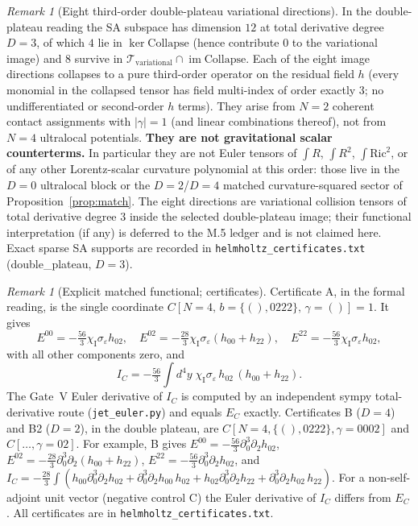 \documentclass{article}
\theoremstyle{remark}
\newtheorem{remark}[proposition]{Remark}
\newcommand{\sigeps}{\sigma_\varepsilon}
\newcommand{\chiI}{\chi_{\mathrm I}}
\newcommand{\Coll}{\mathrm{Collapse}}
\begin{document}
\begin{remark}[Eight third-order double-plateau variational directions]
\label{rem:thirdorder}
In the double-plateau reading the SA subspace has dimension $12$ at total derivative degree $D=3$, of which $4$ lie in $\ker\Coll$ (hence contribute $0$ to the variational image) and $8$ survive in $\mathcal T_{\mathrm{variational}}\cap\operatorname{im}\Coll$.
Each of the eight image directions collapses to a pure third-order operator on the residual field $h$ (every monomial in the collapsed tensor has field multi-index of order exactly $3$; no undifferentiated or second-order $h$ terms).
They arise from $N=2$ coherent contact assignments with $|\gamma|=1$ (and linear combinations thereof), not from $N=4$ ultralocal potentials.
\textbf{They are not gravitational scalar counterterms.}
In particular they are not Euler tensors of $\int R$, $\int R^2$, $\int\mathrm{Ric}^2$, or of any other Lorentz-scalar curvature polynomial at this order: those live in the $D=0$ ultralocal block or the $D=2$/$D=4$ matched curvature-squared sector of Proposition~\ref{prop:match}.
The eight directions are variational collision tensors of total derivative degree $3$ inside the selected double-plateau image; their functional interpretation (if any) is deferred to the M.5 ledger and is not claimed here.
Exact sparse SA supports are recorded in \texttt{helmholtz\_certificates.txt} (double\_plateau, $D=3$).
\end{remark}

\begin{remark}[Explicit matched functional; certificates]
\label{rem:cert}
Certificate A, in the formal reading, is the single coordinate $C[N=4,\,b=\{(),0222\},\,\gamma=()]=1$. It gives
\[
E^{00}=-\tfrac{56}3\chiI\sigeps h_{02},\quad E^{02}=-\tfrac{28}3\chiI\sigeps(h_{00}+h_{22}),\quad E^{22}=-\tfrac{56}3\chiI\sigeps h_{02},
\]
with all other components zero, and
\[
I_C=-\tfrac{56}3\int d^4y\;\chiI\sigeps\,h_{02}\,(h_{00}+h_{22}).
\]
The Gate~V Euler derivative of $I_C$ is computed by an independent sympy total-derivative route (\texttt{jet\_euler.py}) and equals $E_C$ exactly.
Certificates B ($D=4$) and B2 ($D=2$), in the double plateau, are $C[N=4,\{(),0222\},\gamma=0002]$ and $C[\ldots,\gamma=02]$.
For example, B gives $E^{00}=-\tfrac{56}3\partial_0^3\partial_2h_{02}$, $E^{02}=-\tfrac{28}3\partial_0^3\partial_2(h_{00}+h_{22})$, $E^{22}=-\tfrac{56}3\partial_0^3\partial_2h_{02}$, and $I_C=-\tfrac{28}3\int(h_{00}\partial_0^3\partial_2h_{02}+\partial_0^3\partial_2h_{00}\,h_{02}+h_{02}\partial_0^3\partial_2h_{22}+\partial_0^3\partial_2h_{02}\,h_{22})$.
For a non-self-adjoint unit vector (negative control C) the Euler derivative of $I_C$ differs from $E_C$.
All certificates are in \texttt{helmholtz\_certificates.txt}.
\end{remark}
\end{document}
